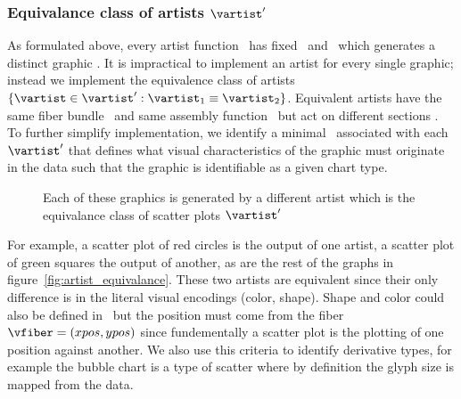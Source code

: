 \documentclass[../main.tex]{subfiles}
\begin{document}
\subsubsection{Equivalance class of artists $\vartist^{\prime}$}
\label{sec:artist_equivalance}
As formulated above, every artist function \vartist\ has fixed \vchannel\ and \vmark\ which  generates a distinct graphic \gsection. It is impractical to implement an artist for every single graphic; instead we implement the equivalence class of artists $\{\vartist \in \vartist^{\prime}: \vartist_{1} \equiv \vartist_{2}\}$. Equivalent artists have the same fiber bundle \vtotal\ and same assembly function \vmark\, but act on different sections \vsection. To further simplify implementation, we identify a minimal \vfiber\ associated with each $\vartist^{\prime}$ that defines what visual characteristics of the graphic must originate in the data such that the graphic is identifiable as a given chart type. 

\begin{figure}[H]
    \caption{Each of these graphics is generated by a different artist \vartist which is the equivalance class of scatter plots $\vartist^{\prime}$}
    \label{fig:artist_equivalence}
\end{figure}
For example, a scatter plot of red circles is the output of one artist, a scatter plot of green squares the output of another, as are the rest of the graphs in figure~\ref{fig:artist_equivalance}. These two artists are equivalent since their only difference is in the literal visual encodings (color, shape). Shape and color could also be defined in \vmark\, but the position must come from the fiber $\vfiber=(xpos,ypos)$ since fundementally a scatter plot is the plotting of one position against another\cite{friendlyBriefHistoryData2008}. We also use this criteria to identify derivative types, for example the bubble chart\cite{tufteVisualDisplayQuantitative2001} is a type of scatter where by definition the glyph size is mapped from the data. 
\end{document}
